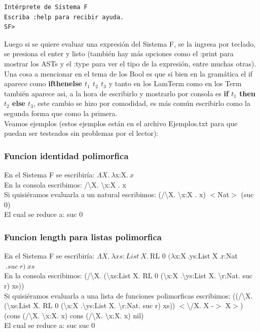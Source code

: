 \documentclass[12pt, titlepage, a4paper]{article}
\begin{document}
\begin{verbatim}
Intérprete de Sistema F
Escriba :help para recibir ayuda.
SF>
\end{verbatim}


Luego si se quiere evaluar una expresión del Sistema F, se la ingresa por teclado, se presiona el enter y listo 
(también hay más opciones como el :print para mostrar los ASTs y el :type para ver el tipo de la expresión, entre muchas otras). \\

Una cosa a mencionar en el tema de los Bool es que si bien en la gramática el if aparece como \textbf{ifthenelse $t_1$ $t_2$ $t_3$} y 
tanto en los LamTerm como en los Term también aparece asi, a la hora de escribirlo y mostrarlo por consola es 
\textbf{if $t_1$ then $t_2$ else $t_3$}, este cambio se hizo por comodidad, es más común escribirlo como la segunda forma que como 
la primera.\\

Veamos ejemplos (estos ejemplos están en el archivo Ejemplos.txt para que puedan ser testeados sin problemas por el lector):

\subsubsection{Funcion identidad polimorfica}
\noindent En el Sistema F se escribiría: $\Lambda X.\ \lambda $x:X$. \ x$ \\
En la consola escribimos: /\textbackslash X. \textbackslash x:X . x \\
Si quisiéramos evaluarla a un natural escribimos: (/\textbackslash X. \textbackslash x:X . x)  $<$Nat$>$ (suc 0) \\
El cual se reduce a: suc 0

\subsubsection{Funcion length para listas polimorfica}
\noindent En el Sistema F se escribiría: $\Lambda X.\ \lambda xs:List \ X. \ $RL 0 $(\lambda $x:X$ \ .$ys:List X$ \ .$r:Nat$\ .suc\ r)\ xs$ \\
En la consola escribimos: (/\textbackslash X. (\textbackslash xs:List X. RL 0 (\textbackslash x:X .\textbackslash ys:List X. \textbackslash r:Nat. suc r) xs)) \\
Si quisiéramos evaluarla a una lista de funciones polimorficas escribimos: 
((/\textbackslash X. (\textbackslash xs:List X. RL 0 (\textbackslash x:X .\textbackslash ys:List X. \textbackslash r:Nat. suc r) xs)) $<$\textbackslash/X. X -$>$ X$>$) 
(cons (/\textbackslash X. \textbackslash x:X. x) cons (/\textbackslash X. \textbackslash x:X. x) nil)\\
El cual se reduce a: suc suc 0 \\
\end{document}
